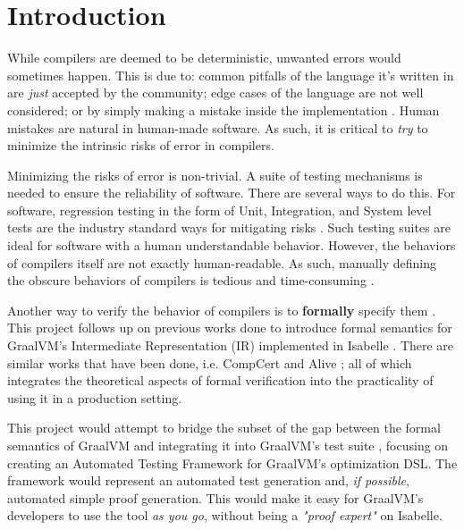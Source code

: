 \section{Introduction}

While compilers are deemed to be deterministic, unwanted errors would sometimes happen. This is due to: common pitfalls of the 
language it's written in are \emph{just} accepted by the community; edge cases of the language are not well considered; or by simply making a 
mistake inside the implementation \cite[Sec. 1.2]{CompilerOptimization}. Human mistakes are natural in human-made software. As such, it is 
critical to \emph{try} to minimize the intrinsic risks of error in compilers.

Minimizing the risks of error is non-trivial. A suite of testing mechanisms is needed to ensure the reliability of software. 
There are several ways to do this. For software, regression testing in the form of Unit, Integration, and System level tests are the 
industry standard ways for mitigating risks \cite{testing}. Such testing suites are ideal for software with a human understandable behavior. However, 
the behaviors of compilers itself are not exactly human-readable. As such, manually defining the obscure behaviors of compilers is tedious and 
time-consuming \cite{compcertVerification}.

Another way to verify the behavior of compilers is to \textbf{formally} specify them \cite{compcertVerification}. This project follows up on 
previous works done to introduce formal semantics for GraalVM's \cite{graal} Intermediate Representation (IR)
\cite{ATVA21_GraalVM_IR_Semantics, Term_Graph_Optimizations} implemented in Isabelle \cite{IsabelleHOL}. There are similar works that have been 
done, i.e. CompCert \cite{compcertVerification} and Alive \cite{AliveInLean,Alive2}; all of which integrates the theoretical aspects of formal 
verification into the practicality of using it in a production setting.

This project would attempt to bridge the subset of the gap between the formal semantics of GraalVM and integrating it into GraalVM's test suite 
\cite{Term_Graph_Optimizations}, focusing on creating an Automated Testing Framework for GraalVM's optimization DSL. The framework would represent an 
automated test generation and, \emph{if possible}, automated simple proof generation. This would make it easy for GraalVM's developers to use 
the tool \emph{as you go}, without being a \emph{"proof expert"} on Isabelle.

